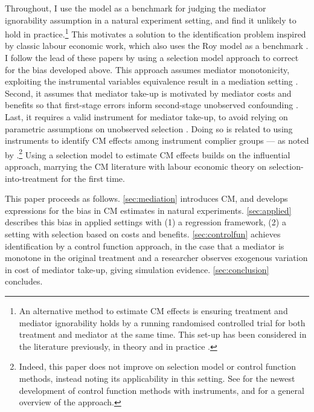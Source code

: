 Throughout, I use the \cite{roy1951some} model as a benchmark for judging the \cite{imai2010identification} mediator ignorability assumption in a natural experiment setting, and find it unlikely to hold in practice.\footnote{
    An alternative method to estimate CM effects is ensuring treatment and mediator ignorability holds by a running randomised controlled trial for both treatment and mediator at the same time.
    This set-up has been considered in the literature previously, in theory \citep{imai2013experimental,heckman2015experimental} and in practice \citep{ludwig2011mechanism,heckman2013understanding}.
}
This motivates a solution to the identification problem inspired by classic labour economic work, which also uses the Roy model as a benchmark \citep{heckman1979sample,heckman1990empirical}.
I follow the lead of these papers by using a selection model approach to correct for the bias developed above.
This approach assumes mediator monotonicity, exploiting the instrumental variables equivalence result in a mediation setting \citep{vytlacil2002independence}.
Second, it assumes that mediator take-up is motivated by mediator costs and benefits so that first-stage errors inform second-stage unobserved confounding \citep{florens2008identification}.
Last, it requires a valid instrument for mediator take-up, to avoid relying on parametric assumptions on unobserved selection \citep{heckman2004using}.
Doing so is related to using instruments to identify CM effects among instrument complier groups --- as noted by \cite{frolich2017direct}.\footnote{
    Indeed, this paper does not improve on selection model or control function methods, instead noting its applicability in this setting.
    See \cite{frolich2017direct} for the newest development of control function methods with instruments, and \cite{imbens2007nonadditive} for a general overview of the approach.
}
Using a selection model to estimate CM effects builds on the influential \cite{imai2010identification} approach, marrying the CM literature with labour economic theory on selection-into-treatment for the first time. 

This paper proceeds as follows.
\autoref{sec:mediation} introduces CM, and develops expressions for the bias in CM estimates in natural experiments.
\autoref{sec:applied} describes this bias in applied settings with (1) a regression framework, (2) a setting with selection based on costs and benefits.
\autoref{sec:controlfun} achieves identification by a control function approach,
in the case that a mediator is monotone in the original treatment and a researcher observes exogenous variation in cost of mediator take-up, giving simulation evidence.
\autoref{sec:conclusion} concludes.
